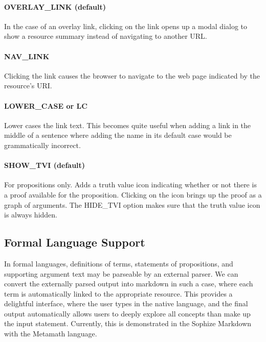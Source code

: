 \documentclass[a4paper]{article}
\begin{document}
\paragraph{OVERLAY\_LINK (default)}

In the case of an overlay link, clicking on the link opens up a modal dialog to show a resource summary instead of navigating to another URL.


\paragraph{NAV\_LINK}

Clicking the link causes the browser to navigate to the web page indicated by the resource's URI.


\paragraph{LOWER\_CASE or LC}

Lower cases the link text. This becomes quite useful when adding a link in the middle of a sentence where adding the name in its default case would be grammatically incorrect.


\paragraph{SHOW\_TVI (default)}

For propositions only. Adds a truth value icon indicating whether or not there is a proof available for the proposition. Clicking on the icon brings up the proof as a graph of arguments. The HIDE\_TVI option makes sure that the truth value icon is always hidden.


\subsection{Formal Language Support}

In formal languages, definitions of terms, statements of propositions, and supporting argument text may be parseable by an external parser. We can convert the externally parsed output into markdown in such a case, where each term is automatically linked to the appropriate resource. This provides a delightful interface, where the user types in the native language, and the final output automatically allows users to deeply explore all concepts than make up the input statement. Currently, this is demonstrated in the Sophize Markdown with the Metamath language.
\end{document}
